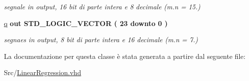 \begin{DoxyCompactItemize}
\begin{DoxyCompactList}\small\item\em segnale in output, 16 bit di parte intera e 8 decimale (m.\+n = 15.) \end{DoxyCompactList}\item 
\hyperlink{group___linear_regression_gacec4f4b6d139d1ada088ca2d3d881418}{q}  {\bfseries {\bfseries \textcolor{vhdlchar}{out}\textcolor{vhdlchar}{ }}} {\bfseries \textcolor{vhdlchar}{S\+T\+D\+\_\+\+L\+O\+G\+I\+C\+\_\+\+V\+E\+C\+T\+OR}\textcolor{vhdlchar}{ }\textcolor{vhdlchar}{(}\textcolor{vhdlchar}{ }\textcolor{vhdlchar}{ } \textcolor{vhdldigit}{23} \textcolor{vhdlchar}{ }\textcolor{vhdlchar}{downto}\textcolor{vhdlchar}{ }\textcolor{vhdlchar}{ } \textcolor{vhdldigit}{0} \textcolor{vhdlchar}{ }\textcolor{vhdlchar}{)}\textcolor{vhdlchar}{ }} 
\begin{DoxyCompactList}\small\item\em segnaes in output, 8 bit di parte intera e 16 decimale (m.\+n = 7.) \end{DoxyCompactList}\end{DoxyCompactItemize}


La documentazione per questa classe è stata generata a partire dal seguente file\+:\begin{DoxyCompactItemize}
\item 
Src/\hyperlink{_linear_regression_8vhd}{Linear\+Regression.\+vhd}\end{DoxyCompactItemize}
